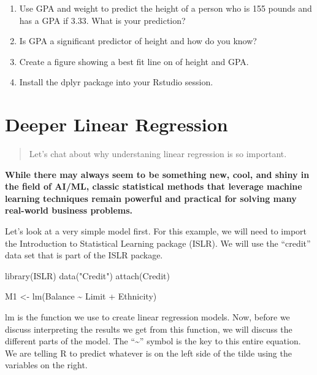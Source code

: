 \documentclass[
]{book}
\newenvironment{Shaded}{\begin{snugshade}}{\end{snugshade}}
\newcommand{\FunctionTok}[1]{\textcolor[rgb]{0.00,0.00,0.00}{#1}}
\newcommand{\NormalTok}[1]{#1}
\newcommand{\OtherTok}[1]{\textcolor[rgb]{0.56,0.35,0.01}{#1}}
\newcommand{\SpecialCharTok}[1]{\textcolor[rgb]{0.00,0.00,0.00}{#1}}
\newcommand{\StringTok}[1]{\textcolor[rgb]{0.31,0.60,0.02}{#1}}
\begin{document}
\begin{enumerate}
\def\labelenumi{\arabic{enumi}.}
\setcounter{enumi}{1}
\item
  Use GPA and weight to predict the height of a person who is 155 pounds and has a GPA if 3.33. What is your prediction?
\item
  Is GPA a significant predictor of height and how do you know?
\item
  Create a figure showing a best fit line on of height and GPA.
\item
  Install the dplyr package into your Rstudio session.
\end{enumerate}

\hypertarget{deeper-linear-regression}{%
\chapter{Deeper Linear Regression}\label{deeper-linear-regression}}

\begin{quote}
Let's chat about why understaning linear regression is so important.
\end{quote}

\textbf{While there may always seem to be something new, cool, and shiny in the field of AI/ML, classic statistical methods that leverage machine learning techniques remain powerful and practical for solving many real-world business problems.}

Let's look at a very simple model first. For this example, we will need to import the Introduction to Statistical Learning package (ISLR). We will use the ``credit'' data set that is part of the ISLR package.

\begin{Shaded}
\begin{Highlighting}[]
\FunctionTok{library}\NormalTok{(ISLR)}
\FunctionTok{data}\NormalTok{(}\StringTok{"Credit"}\NormalTok{)}
\FunctionTok{attach}\NormalTok{(Credit)}

\NormalTok{M1 }\OtherTok{\textless{}{-}} \FunctionTok{lm}\NormalTok{(Balance }\SpecialCharTok{\textasciitilde{}}\NormalTok{ Limit }\SpecialCharTok{+}\NormalTok{ Ethnicity)}
\end{Highlighting}
\end{Shaded}

lm is the function we use to create linear regression models. Now, before we discuss interpreting the results we get from this function, we will discuss the different parts of the model. The ``\textasciitilde{}'' symbol is the key to this entire equation. We are telling R to predict whatever is on the left side of the tilde using the variables on the right.
\end{document}
